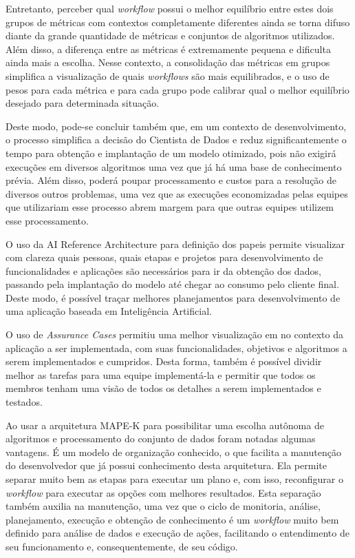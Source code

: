 \documentclass[portugues]{ic-tese}
\begin{document}
Entretanto, perceber qual \textit{workflow} possui o melhor equilíbrio entre estes dois grupos de métricas com contextos completamente diferentes ainda se torna difuso diante da grande quantidade de métricas e conjuntos de algoritmos utilizados. Além disso, a diferença entre as métricas é extremamente pequena e dificulta ainda mais a escolha. Nesse contexto, a consolidação das métricas em grupos simplifica a visualização de quais \textit{workflows} são mais equilibrados, e o uso de pesos para cada métrica e para cada grupo pode calibrar qual o melhor equilíbrio desejado para determinada situação.

Deste modo, pode-se concluir também que, em um contexto de desenvolvimento, o processo simplifica a decisão do Cientista de Dados e reduz significantemente o tempo para obtenção e implantação de um modelo otimizado, pois não exigirá execuções em diversos algoritmos uma vez que já há uma base de conhecimento prévia. Além disso, poderá poupar processamento e custos para a resolução de diversos outros problemas, uma vez que as execuções economizadas pelas equipes que utilizariam esse processo abrem margem para que outras equipes utilizem esse processamento.

O uso da AI Reference Architecture para definição dos papeis permite visualizar com clareza quais pessoas, quais etapas e projetos para desenvolvimento de funcionalidades e aplicações são necessários para ir da obtenção dos dados, passando pela implantação do modelo até chegar ao consumo pelo cliente final. Deste modo, é possível traçar melhores planejamentos para desenvolvimento de uma aplicação baseada em Inteligência Artificial.

O uso de \textit{Assurance Cases} permitiu uma melhor visualização em no contexto da aplicação a ser implementada, com suas funcionalidades, objetivos e algoritmos a serem implementados e cumpridos. Desta forma, também é possível dividir melhor as tarefas para uma equipe implementá-la e permitir que todos os membros tenham uma visão de todos os detalhes a serem implementados e testados.

Ao usar a arquitetura MAPE-K para possibilitar uma escolha autônoma de algoritmos e processamento do conjunto de dados foram notadas algumas vantagens. É um modelo de organização conhecido, o que facilita a manutenção do desenvolvedor que já possui conhecimento desta arquitetura. Ela permite separar muito bem as etapas para executar um plano e, com isso, reconfigurar o \textit{workflow} para executar as opções com melhores resultados. Esta separação também auxilia na manutenção, uma vez que o ciclo de monitoria, análise, planejamento, execução e obtenção de conhecimento é um \textit{workflow} muito bem definido para análise de dados e execução de ações, facilitando o entendimento de seu funcionamento e, consequentemente, de seu código.
\end{document}
